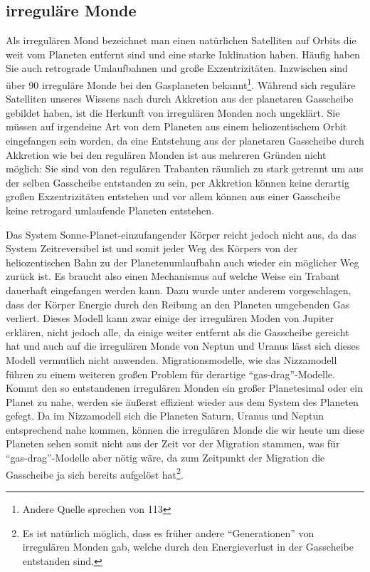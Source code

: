 \documentclass[10pt,a4paper,twoside]{article}
\begin{document}
\subsection{irreguläre Monde}
Als irregulären Mond bezeichnet man einen natürlichen Satelliten auf Orbits die weit vom Planeten entfernt sind und eine starke Inklination haben\cite{Nesvorny2007}. %
Häufig haben Sie auch retrograde Umlaufbahnen und große Exzentrizitäten.
Inzwischen sind über 90 irreguläre Monde bei den Gasplaneten bekannt\cite{Nesvorny2007}\footnote{Andere Quelle sprechen von 113}. %
Während sich reguläre Satelliten unseres Wissens nach durch Akkretion aus der planetaren Gasscheibe gebildet haben, ist die Herkunft von irregulären Monden noch ungeklärt.
Sie müssen auf irgendeine Art von dem Planeten aus einem heliozentischem Orbit eingefangen sein worden, da eine Entstehung aus der planetaren Gasscheibe durch Akkretion wie bei den regulären Monden ist aus mehreren Gründen nicht möglich:
Sie sind von den regulären Trabanten räumlich zu stark getrennt um aus der selben Gasscheibe entstanden zu sein, per Akkretion können keine derartig großen Exzentrizitäten entstehen und vor allem können aus einer Gasscheibe keine retrogard umlaufende Planeten entstehen\cite{Nesvorny2007}. %

Das System Sonne-Planet-einzufangender Körper reicht jedoch nicht aus, da das System Zeitreversibel ist und somit jeder Weg des Körpers von der heliozentischen Bahn zu der Planetenumlaufbahn auch wieder ein möglicher Weg zurück ist\cite{Nesvorny2007}. %
Es braucht also einen Mechanismus auf welche Weise ein Trabant dauerhaft eingefangen werden kann. Dazu wurde unter anderem vorgeschlagen, dass der Körper Energie durch den Reibung an den Planeten umgebenden Gas verliert. %
Dieses Modell kann zwar einige der irregulären Moden von Jupiter erklären, nicht jedoch alle, da einige weiter entfernt als die Gasscheibe gereicht hat und auch auf die irregulären Monde von Neptun und Uranus lässt sich dieses Modell vermutlich nicht anwenden. %
Migrationsmodelle, wie das Nizzamodell führen zu einem weiteren großen Problem für derartige "`gas-drag"'-Modelle. Kommt den so entstandenen irregulären Monden ein großer Planetesimal oder ein Planet zu nahe, werden sie äußerst effizient wieder aus dem System des Planeten gefegt\cite{Nesvorny2007}. Da im Nizzamodell sich die Planeten Saturn, Uranus und Neptun entsprechend nahe kommen, können die irregulären Monde die wir heute um diese Planeten sehen somit nicht aus der Zeit vor der Migration stammen\cite{Tsiganis2005}\cite{Nesvorny2007}, was für "`gas-drag"'-Modelle aber nötig wäre, da zum Zeitpunkt der Migration die Gasscheibe ja sich bereits aufgelöst hat\footnote{Es ist natürlich möglich, dass es früher andere "`Generationen"' von irregulären Monden gab, welche durch den Energieverlust in der Gasscheibe entstanden sind. }. %
\end{document}
